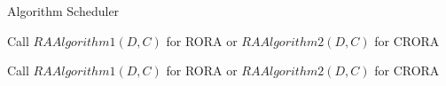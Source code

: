 \documentclass[times]{dacauth}
\begin{document}
\par
 \begin{algorithm}	
   \caption{Algorithm Scheduler}
   \label{algorthm1}
    \begin{algorithmic}[1]

        
        \State Call $RAAlgorithm1(D,C)$ for RORA or $RAAlgorithm2(D,C)$ for CRORA
        
        	\State Call $RAAlgorithm1(D,C)$ for RORA or $RAAlgorithm2(D,C)$ for CRORA
        	\EndIf       	
        \EndWhile
        	
	\EndProcedure

\end{algorithmic}
\end{algorithm}
\end{document}
